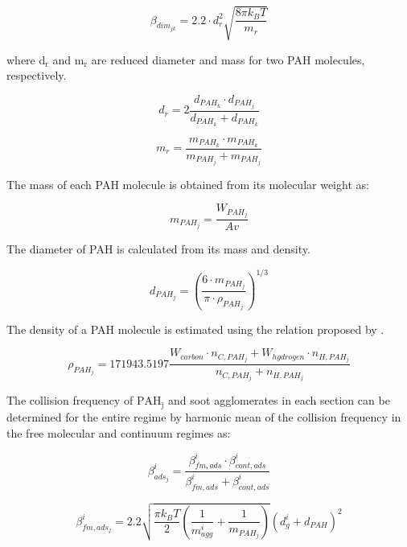 \begin{equation}
	\beta_{dim_{jk}}=
	2.2 \cdot d^2_{r} \sqrt{\frac{8 \pi k_B T}{m_{r}}}
	\label{eqn:betadim}
\end{equation}

where $\mathrm{d_{r}}$ and $\mathrm{m_{r}}$ are reduced diameter and mass for two PAH molecules, respectively.

\begin{equation}
	d_{r}=
	2\frac{d_{PAH_k}\cdot d_{PAH_j}}{d_{PAH_k}+d_{PAH_k}}
	\label{eqn:drPAH}
\end{equation}

\begin{equation}
	m_{r}=
	\frac{m_{PAH_k}\cdot m_{PAH_k}}{m_{PAH_j}+ m_{PAH_j}}
	\label{eqn:mrPAH}
\end{equation}

The mass of each PAH molecule is obtained from its molecular weight as:

\begin{equation}
	m_{PAH_j}=
	\frac{W_{PAH_j}}{Av}
	\label{eqn:mPAH}
\end{equation}

The diameter of PAH is calculated from its mass and density.

\begin{equation}
	d_{PAH_j}=
	\left(
	\frac{6\cdot m_{PAH_j}}{\pi\cdot\rho_{PAH_j}}
	\right)^{1/3}
	\label{eqn:dPAH}
\end{equation}

The density of a PAH molecule is estimated using the relation proposed by \citet{johansson2016formation}.

\begin{equation}
	\rho_{PAH_j}= 
	171943.5197
	\frac{W_{carbon}\cdot n_{C,PAH_j}+W_{hydrogen}\cdot n_{H,PAH_j}}
	{n_{C,PAH_j}+n_{H,PAH_j}}
	\label{eqn:rhoPAH}
\end{equation}

The collision frequency of $\mathrm{PAH_j}$ and soot agglomerates in each section can be determined for the entire regime by harmonic mean of the collision frequency in the free molecular and continuum regimes as:

\begin{equation}
	\beta^i_{ads_j}=
	\frac{\beta^i_{fm, ads}\cdot \beta^i_{cont, ads}}
	{\beta^i_{fm, ads}+\beta^i_{cont, ads}}
	\label{eqn:betahmads}
\end{equation}

\begin{equation}
	\beta^i_{fm, ads_j}=
	2.2 
	\sqrt{
		\frac{\pi k_B T}{2}\left(\frac{1}{m^i_{agg}}+\frac{1}{m_{PAH_j}}\right)
	}
	\left(d^i_g+d_{PAH}\right)^2
	\label{eqn:betafmads}
\end{equation}

